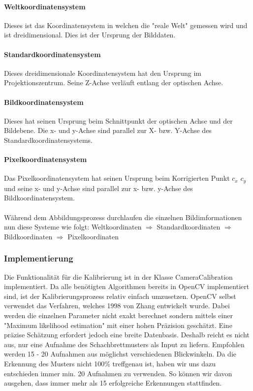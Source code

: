 \documentclass[main.tex]{subfiles}
\begin{document}
\paragraph{Weltkoordinatensystem} Dieses ist das Koordinatensystem in welchen die "reale Welt" gemessen wird und ist dreidimensional. Dies ist der Ursprung der Bilddaten.

\paragraph{Standardkoordinatensystem} Dieses dreidimensionale Koordinatensystem hat den Ursprung im Projektionszentrum. Seine Z-Achse verläuft entlang der optischen Achse.

\paragraph{Bildkoordinatensystem} Dieses hat seinen Ursprung beim Schnittpunkt der optischen Achse und der Bildebene. Die x- und y-Achse sind parallel zur X- bzw. Y-Achse des Standardkoordinatensystems.

\paragraph{Pixelkoordinatensystem} Das Pixelkoordinatensystem hat seinen Ursprung beim Korrigierten Punkt $c_x$ \/ $c_y$  und seine x- und y-Achse sind parallel zur x- bzw. y-Achse des Bildkoordinatensystem.

\paragraph{} Während dem Abbildungsprozess durchlaufen die einzelnen Bildimformationen nun diese Systeme wie folgt: Weltkoordinaten $\Rightarrow$ Standardkoordinaten $\Rightarrow$ Bildkoordinaten $\Rightarrow$ Pixelkoordinaten

\subsubsection{Implementierung}
Die Funktionalität für die Kalibrierung ist in der Klasse CameraCalibration implementiert. Da alle benötigten Algorithmen bereits in OpenCV implementiert sind, ist der Kalibrierungsprozess relativ einfach umzusetzen. OpenCV selbst verwendet das Verfahren, welches 1998 von Zhang\cite{zhang} entwickelt wurde. Dabei werden die einzelnen Parameter nicht exakt berechnet sondern mittels einer "Maximum likelihood estimation" mit einer hohen Präzision geschätzt. Eine präzise Schätzung erfordert jedoch eine breite Datenbasis. Deshalb reicht es nicht aus, nur eine Aufnahme des Schachbrettmusters als Input zu liefern. Empfohlen werden 15 - 20 Aufnahmen aus möglichst verschiedenen Blickwinkeln. Da die Erkennung des Musters nicht 100\% treffgenau ist, haben wir uns dazu entschieden immer min. 20 Aufnahmen zu verwenden. So können wir davon ausgehen, dass immer mehr als 15 erfolgreiche Erkennungen stattfinden.
\end{document}
